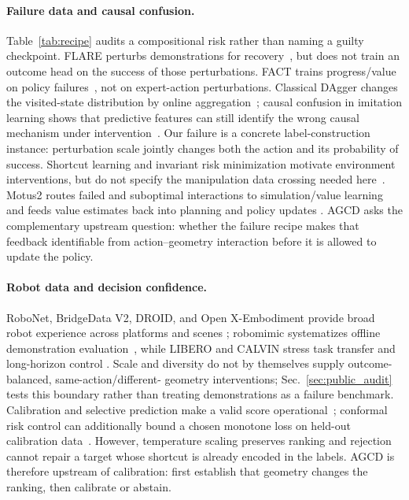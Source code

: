\documentclass[conference]{IEEEtran}
\begin{document}
\paragraph{Failure data and causal confusion.}
Table~\ref{tab:recipe} audits a compositional risk rather than naming a guilty
checkpoint. FLARE perturbs demonstrations for recovery~\cite{flare2026}, but
does not train an outcome head on the success of those perturbations. FACT
trains progress/value on policy failures~\cite{fact2026}, not on
expert-action perturbations. Classical DAgger changes the visited-state
distribution by online aggregation~\cite{ross2011dagger}; causal confusion in
imitation learning shows that predictive features can still identify the wrong
causal mechanism under intervention~\cite{dehaan2019causal}. Our failure is a
concrete label-construction instance: perturbation scale jointly changes both
the action and its probability of success. Shortcut learning and invariant
risk minimization motivate environment interventions, but do not specify the
manipulation data crossing needed here~\cite{geirhos2020shortcut,arjovsky2019irm}.
Motus2 routes failed and suboptimal interactions to simulation/value learning
and feeds value estimates back into planning and policy updates
\cite{motus2_2026}. AGCD asks the complementary upstream question: whether the
failure recipe makes that feedback identifiable from action--geometry
interaction before it is allowed to update the policy.

\paragraph{Robot data and decision confidence.}
RoboNet, BridgeData V2, DROID, and Open X-Embodiment provide broad robot
experience across platforms and scenes
\cite{dasari2020robonet,bridgedata2023,khazatsky2024droid,openx2024}; robomimic
systematizes offline demonstration evaluation~\cite{mandlekar2022robomimic},
while LIBERO and CALVIN stress task transfer and long-horizon control
\cite{liu2023libero,mees2022calvin}. Scale and
diversity do not by themselves supply outcome-balanced, same-action/different-
geometry interventions; Sec.~\ref{sec:public_audit} tests this boundary rather
than treating demonstrations as a failure benchmark. Calibration and selective
prediction make a valid score operational~\cite{guo2017calibration,
geifman2019selective}; conformal risk control can additionally bound a chosen
monotone loss on held-out calibration data~\cite{angelopoulos2024crc}. However,
temperature scaling preserves ranking and rejection
cannot repair a target whose shortcut is already encoded in the labels. AGCD is
therefore upstream of calibration: first establish that geometry changes the
ranking, then calibrate or abstain.
\end{document}
